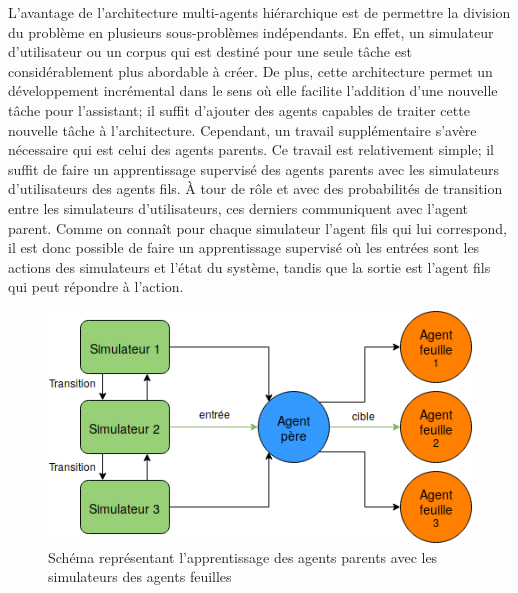 L'avantage de l'architecture multi-agents hiérarchique est de permettre la division du problème en plusieurs sous-problèmes indépendants. En effet, un simulateur d'utilisateur ou un corpus qui est destiné pour une seule tâche est considérablement plus abordable à créer. De plus, cette architecture permet un développement incrémental dans le sens où elle facilite l'addition d'une nouvelle tâche pour l'assistant; il suffit d'ajouter des agents capables de traiter cette nouvelle tâche à l'architecture. Cependant, un travail supplémentaire s'avère nécessaire qui est celui des agents parents. Ce travail est relativement simple; il suffit de faire un apprentissage supervisé des agents parents avec les simulateurs d'utilisateurs des agents fils. À tour de rôle et avec des probabilités de transition entre les simulateurs d'utilisateurs, ces derniers communiquent avec l'agent parent. Comme on connaît pour chaque simulateur l'agent fils qui lui correspond, il est donc possible de faire un apprentissage supervisé où les entrées sont les actions des simulateurs et l'état du système, tandis que la sortie est l'agent fils qui peut répondre à l'action.
\begin{figure}[H] 
	
	\centering
	\includegraphics[width=0.5\linewidth]{images/Conception/DM/train_parent.png}
	\caption{Schéma représentant l'apprentissage des agents parents avec les simulateurs des agents feuilles}
\end{figure}\label{train_parent}
